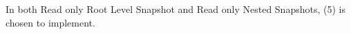 In both Read only Root Level Snapshot and Read only Nested Snapshots, (5) is chosen to implement.\\












